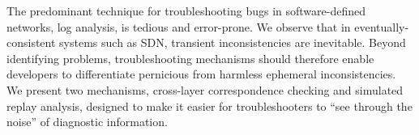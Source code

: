 The predominant technique for troubleshooting bugs in software-defined networks,
log analysis, is tedious and error-prone. We observe that
in eventually-consistent systems such as SDN,
transient inconsistencies are inevitable. Beyond identifying problems,
troubleshooting mechanisms should therefore enable developers to differentiate
pernicious from harmless ephemeral inconsistencies. We present two
mechanisms, cross-layer correspondence checking and simulated replay analysis, 
designed to make it easier for troubleshooters to ``see through the noise'' of
diagnostic information.
